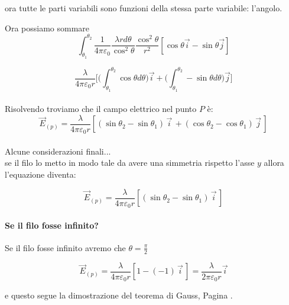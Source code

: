 ora tutte le parti variabili sono funzioni della stessa parte variabile: l'angolo.

Ora possiamo sommare 
\begin{equation*}
    \int_{\theta_1}^{\theta_2} \frac{1}{4\pi \varepsilon_0}\frac{\lambda r d\theta}{\cos^2\theta}\frac{\cos^2\theta}{r^2}[\cos\theta\vec{i} - \sin\theta\vec{j}]
\end{equation*}

\begin{equation*}
    \frac{\lambda}{4\pi \varepsilon_0 r} \biggl[\biggl( \int_{\theta_1}^{\theta_2} \cos\theta d\theta \biggl)\vec{i} + \biggl(\int_{\theta_1}^{\theta_2} -\sin\theta d\theta \biggl)\vec{j}\biggl]
\end{equation*}

\paragraph{}
Risolvendo troviamo che il campo elettrico nel punto $P$ è:
\begin{equation}
    \vec{E}_{(p)}  = \frac{\lambda}{4\pi \varepsilon_0 r}[(\sin\theta_2 - \sin\theta_1)\,\vec{i}\,  + (\cos\theta_2 - \cos\theta_1)\,\vec{j}\,]
\end{equation}

\paragraph{}
Alcune considerazioni finali...\\
se il filo lo metto in modo tale da avere una simmetria rispetto l'asse $y$ allora l'equazione diventa:

\begin{equation}
    \vec{E}_{(p)}  = \frac{\lambda}{4\pi \varepsilon_0 r}[(\sin\theta_2 - \sin\theta_1)\,\vec{i}\,]
\end{equation}

\paragraph{Se il filo fosse infinito?}
Se il filo fosse infinito avremo che $\theta = \frac{\pi}{2}$

\begin{equation*}
    \vec{E}_{(p)} = \frac{\lambda}{4\pi \varepsilon_0 r}[1-(-1)\,\vec{i}\,] = \frac{\lambda}{2\pi \varepsilon_0 r}\vec{i}
\end{equation*}

e questo segue la dimostrazione del teorema di Gauss, Pagina \pageref{paginaCampoElettricoCavoInfinito}.

